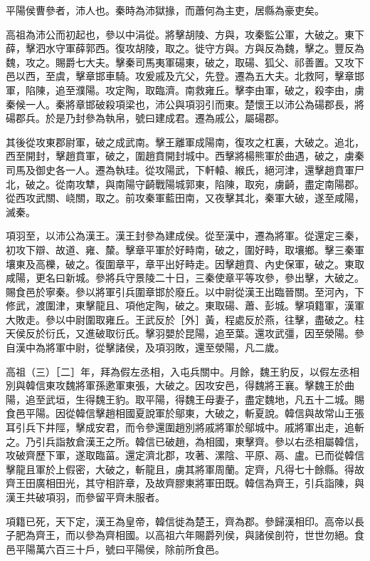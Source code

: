 
\begin{pinyinscope}
平陽侯曹參者，沛人也。秦時為沛獄掾，而蕭何為主吏，居縣為豪吏矣。

高祖為沛公而初起也，參以中涓從。將擊胡陵、方與，攻秦監公軍，大破之。東下薛，擊泗水守軍薛郭西。復攻胡陵，取之。徙守方與。方與反為魏，擊之。豐反為魏，攻之。賜爵七大夫。擊秦司馬夷軍碭東，破之，取碭、狐父、祁善置。又攻下邑以西，至虞，擊章邯車騎。攻爰戚及亢父，先登。遷為五大夫。北救阿，擊章邯軍，陷陳，追至濮陽。攻定陶，取臨濟。南救雍丘。擊李由軍，破之，殺李由，虜秦候一人。秦將章邯破殺項梁也，沛公與項羽引而東。楚懷王以沛公為碭郡長，將碭郡兵。於是乃封參為執帛，號曰建成君。遷為戚公，屬碭郡。

其後從攻東郡尉軍，破之成武南。擊王離軍成陽南，復攻之杠裏，大破之。追北，西至開封，擊趙賁軍，破之，圍趙賁開封城中。西擊將楊熊軍於曲遇，破之，虜秦司馬及御史各一人。遷為執珪。從攻陽武，下軒轅、緱氏，絕河津，還擊趙賁軍尸北，破之。從南攻犨，與南陽守齮戰陽城郭東，陷陳，取宛，虜齮，盡定南陽郡。從西攻武關、峣關，取之。前攻秦軍藍田南，又夜擊其北，秦軍大破，遂至咸陽，滅秦。

項羽至，以沛公為漢王。漢王封參為建成侯。從至漢中，遷為將軍。從還定三秦，初攻下辯、故道、雍、斄。擊章平軍於好畤南，破之，圍好畤，取壤鄉。擊三秦軍壤東及高櫟，破之。復圍章平，章平出好畤走。因擊趙賁、內史保軍，破之。東取咸陽，更名曰新城。參將兵守景陵二十日，三秦使章平等攻參，參出擊，大破之。賜食邑於寧秦。參以將軍引兵圍章邯於廢丘。以中尉從漢王出臨晉關。至河內，下修武，渡圍津，東擊龍且、項他定陶，破之。東取碭、蕭、彭城。擊項籍軍，漢軍大敗走。參以中尉圍取雍丘。王武反於［外］黃，程處反於燕，往擊，盡破之。柱天侯反於衍氏，又進破取衍氏。擊羽嬰於昆陽，追至葉。還攻武彊，因至滎陽。參自漢中為將軍中尉，從擊諸侯，及項羽敗，還至滎陽，凡二歲。

高祖（三）［二］年，拜為假左丞相，入屯兵關中。月餘，魏王豹反，以假左丞相別與韓信東攻魏將軍孫遬軍東張，大破之。因攻安邑，得魏將王襄。擊魏王於曲陽，追至武垣，生得魏王豹。取平陽，得魏王母妻子，盡定魏地，凡五十二城。賜食邑平陽。因從韓信擊趙相國夏說軍於鄔東，大破之，斬夏說。韓信與故常山王張耳引兵下井陘，擊成安君，而令參還圍趙別將戚將軍於鄔城中。戚將軍出走，追斬之。乃引兵詣敖倉漢王之所。韓信已破趙，為相國，東擊齊。參以右丞相屬韓信，攻破齊歷下軍，遂取臨菑。還定濟北郡，攻著、漯陰、平原、鬲、盧。已而從韓信擊龍且軍於上假密，大破之，斬龍且，虜其將軍周蘭。定齊，凡得七十餘縣。得故齊王田廣相田光，其守相許章，及故齊膠東將軍田既。韓信為齊王，引兵詣陳，與漢王共破項羽，而參留平齊未服者。

項籍已死，天下定，漢王為皇帝，韓信徙為楚王，齊為郡。參歸漢相印。高帝以長子肥為齊王，而以參為齊相國。以高祖六年賜爵列侯，與諸侯剖符，世世勿絕。食邑平陽萬六百三十戶，號曰平陽侯，除前所食邑。


\end{pinyinscope}
